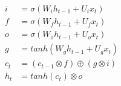 \begin{align*}
i &= \sigma(W_{i}h_{t-1} + U_{i}x_{t})
\\
f &= \sigma(W_{f}h_{t-1} + U_{f}x_{t})
\\
o &= \sigma(W_{o}h_{t-1} + U_{o}x_{t})
\\
g &= tanh(W_{g}h_{t-1} + U_{g}x_{t})
\\
c_{t} &= (c_{t-1} \otimes f) \oplus (g \otimes i)
\\
h_{t} &= tanh(c_{t}) \otimes o
\end{align*}

